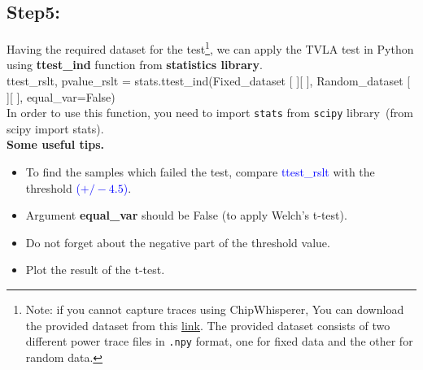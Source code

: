 \documentclass[11pt]{article}
\newcommand{\inBlue}[1]{\textcolor{blue}{#1}}
\newcommand{\inRed}[1]{\textcolor{myred}{#1}}
\newcommand{\inGreen}[1]{\textcolor{ao}{#1}}
\begin{document}
\subsection{Step5:}
Having the required dataset for the test\footnote{Note: if you cannot capture traces using ChipWhisperer, You can download the provided dataset from this \href{https://mega.nz/folder/IoYxUIqC\#vTX_8ll83x7fx7IEx3OraQ}{link}. The provided dataset consists of two different power trace files in \texttt{.npy} format, one for fixed data and the other for random data.}, we can apply the TVLA test in Python using \textbf{ttest\_ind} function from \textbf{statistics library}. \\


\noindent \inGreen{ttest\_rslt}, \inGreen{pvalue\_rslt} = stats.ttest\_ind(Fixed\_dataset [ ][ ], Random\_dataset [ ][ ], equal\_var=False)\\
In order to use this function, you need to import \texttt{stats} from \texttt{scipy} library~(\inGreen{from} scipy \inGreen{import} stats).\\

\textbf{Some useful tips.}
\begin{itemize}
\item To find the samples which failed the test, compare \inBlue{ttest\_rslt} with the threshold \inBlue{($+/-4.5$)}. 
\item Argument \textbf{equal\_var} should be \inGreen{False} (to apply Welch's t-test). 
\item Do not forget about \inRed{the negative part} of the threshold value. 
\item Plot the result of the t-test. 
\end{itemize}
\end{document}
